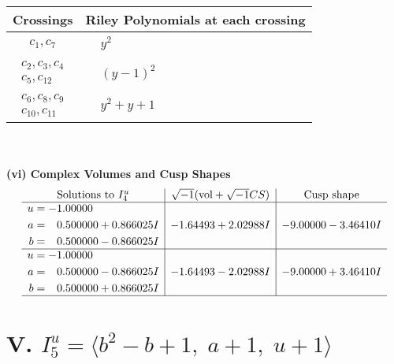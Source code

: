 \documentclass[1p]{elsarticle_modified}
\theoremstyle{definition}
\newcommand{\I}{\sqrt{-1}}
\begin{document}
\begin{tabular}{m{50pt}|m{274pt}}
Crossings & \hspace{64pt}Riley Polynomials at each crossing \\
\hline $$\begin{aligned}c_{1},c_{7}\end{aligned}$$&$\begin{aligned}
&y^2
\end{aligned}$\\
\hline $$\begin{aligned}c_{2},c_{3},c_{4}\\c_{5},c_{12}\end{aligned}$$&$\begin{aligned}
&(y-1)^2
\end{aligned}$\\
\hline $$\begin{aligned}c_{6},c_{8},c_{9}\\c_{10},c_{11}\end{aligned}$$&$\begin{aligned}
&y^2+y+1
\end{aligned}$\\
\hline
\end{tabular}\\~\\
\newpage\flushleft \textbf{(vi) Complex Volumes and Cusp Shapes}
$$\begin{array}{c|c|c}  
\text{Solutions to }I^u_{4}& \I (\text{vol} + \sqrt{-1}CS) & \text{Cusp shape}\\
 \hline 
\begin{aligned}
u &= -1.00000\phantom{ +0.000000I} \\
a &= \phantom{-}0.500000 + 0.866025 I \\
b &= \phantom{-}0.500000 - 0.866025 I\end{aligned}
 & -1.64493 + 2.02988 I & -9.00000 - 3.46410 I \\ \hline\begin{aligned}
u &= -1.00000\phantom{ +0.000000I} \\
a &= \phantom{-}0.500000 - 0.866025 I \\
b &= \phantom{-}0.500000 + 0.866025 I\end{aligned}
 & -1.64493 - 2.02988 I & -9.00000 + 3.46410 I\\
 \hline 
 \end{array}$$\newpage\newpage\renewcommand{\arraystretch}{1}
\centering \section*{V. $I^u_{5}= \langle b^2- b+1,\;a+1,\;u+1 \rangle$}
\end{document}
